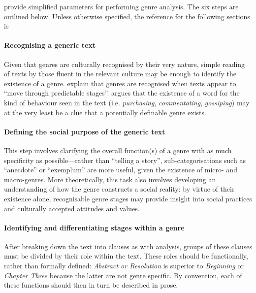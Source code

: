 			\textcite{eggins_analysing_2004} provide simplified parameters for performing genre analysis. The six steps are outlined below. Unless otherwise specified, the reference for the following sections is \textcite{eggins_analysing_2004}

			\paragraph{Recognising a generic text}

			Given that genres are culturally recognised by their very nature, simple reading of texts by those fluent in the relevant culture may be enough to identify the existence of a genre. \citeyear[p.~213]{eggins_analysing_2004} explain that genres are recognised when texts appear to ``move through predictable stages''. \textcite{eggins_introduction_2004} argues that the existence of a word for the kind of behaviour seen in the text (i.e. \emph{purchasing}, \emph{commentating}, \emph{gossiping}) may at the very least be a clue that a potentially definable genre exists.


			\paragraph{Defining the social purpose of the generic text}

			   This step involves clarifying the overall function(s) of a genre with as much specificity as possible---rather than ``telling a story'', sub-categorisations such as ``anecdote'' or ``exemplum'' are more useful, given the existence of micro- and macro-genres. More theoretically, this task also involves developing an understanding of how the genre constructs a social reality: by virtue of their existence alone, recognisable genre stages may provide insight into social practices and culturally accepted attitudes and values. 

			\paragraph{Identifying and differentiating stages within a genre}

			   After breaking down the text into clauses as with  analysis, groups of these clauses must be divided by their role within the text. These roles should be functionally, rather than formally defined: \emph{Abstract or Resolution} is superior to \emph{Beginning} or \emph{Chapter Three} because the latter are not genre specific. By convention, each of these functions should then in turn be described in prose.

